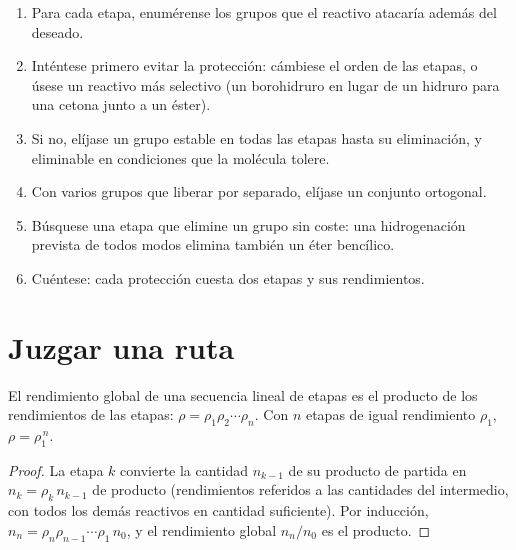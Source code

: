 \begin{method}\label{met:b2:retrosynthesis:protect-in-route}
\begin{enumerate}
  \item Para cada etapa, enumérense los grupos que el reactivo atacaría además del deseado.
  \item Inténtese primero evitar la protección: cámbiese el orden de las etapas, o úsese un reactivo más selectivo
        (un borohidruro en lugar de un hidruro para una cetona junto a un éster).
  \item Si no, elíjase un grupo estable en todas las etapas hasta su eliminación, y eliminable en condiciones que la
        molécula tolere.
  \item Con varios grupos que liberar por separado, elíjase un conjunto ortogonal.
  \item Búsquese una etapa que elimine un grupo sin coste: una hidrogenación prevista de todos modos elimina también un
        éter bencílico.
  \item Cuéntese: cada protección cuesta dos etapas y sus rendimientos.
\end{enumerate}
\end{method}

\section{Juzgar una ruta}\label{sec:b2:retrosynthesis:judging}

\begin{proposition}\label{prop:b2:retrosynthesis:overall-yield}
El rendimiento global de una secuencia lineal de etapas es el producto de los rendimientos de las etapas:
$\rho = \rho_1 \rho_2 \cdots \rho_n$. Con $n$ etapas de igual rendimiento $\rho_1$, $\rho = \rho_1^{\,n}$.
\end{proposition}

\begin{proof}
La etapa $k$ convierte la cantidad $n_{k-1}$ de su producto de partida en $n_k = \rho_k\, n_{k-1}$ de producto
(rendimientos referidos a las cantidades del intermedio, con todos los demás reactivos en cantidad suficiente). Por inducción,
$n_n = \rho_n \rho_{n-1} \cdots \rho_1\, n_0$, y el rendimiento global $n_n/n_0$ es el producto.
\end{proof}

